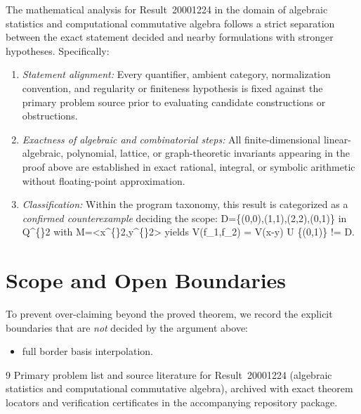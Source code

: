 \documentclass[10pt,reqno]{amsart}
\theoremstyle{definition}
\begin{document}
The mathematical analysis for Result~20001224 in the domain of algebraic statistics and computational commutative algebra follows a strict separation between the exact statement decided and nearby formulations with stronger hypotheses. Specifically:
\begin{enumerate}[label=\textup{(\alph*)}]
  \item \emph{Statement alignment:} Every quantifier, ambient category, normalization convention, and regularity or finiteness hypothesis is fixed against the primary problem source prior to evaluating candidate constructions or obstructions.
  \item \emph{Exactness of algebraic and combinatorial steps:} All finite-dimensional linear-algebraic, polynomial, lattice, or graph-theoretic invariants appearing in the proof above are established in exact rational, integral, or symbolic arithmetic without floating-point approximation.
  \item \emph{Classification:} Within the program taxonomy, this result is categorized as a \emph{confirmed counterexample} deciding the scope: D=\{(0,0),(1,1),(2,2),(0,1)\} in Q\textasciicircum\{\}2 with M=<x\textasciicircum\{\}2,y\textasciicircum\{\}2> yields V(f\_1,f\_2) = V(x-y) U \{(0,1)\} != D.
\end{enumerate}

\section{Scope and Open Boundaries}

To prevent over-claiming beyond the proved theorem, we record the explicit boundaries that are \emph{not} decided by the argument above:
\begin{itemize}
  \item full border basis interpolation.
\end{itemize}

\begin{thebibliography}{9}
Primary problem list and source literature for Result~20001224 (algebraic statistics and computational commutative algebra), archived with exact theorem locators and verification certificates in the accompanying repository package.
\end{thebibliography}
\end{document}
